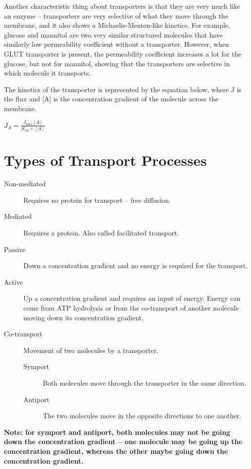 Another characteristic thing about transporters is that they are very much like an enzyme -- transporters are very selective of what they move through the membrane, and it also shows a Michaelis-Menten-like kinetics.
For example, glucose and mannitol are two very similar structured molecules that have similarly low permeability coefficient without a transporter.
However, when GLUT transporter is present, the permeability coefficient increases a lot for the glucose, but not for mannitol, showing that the transporters are selective in which molecule it transports.

\begin{center}
\end{center}

The kinetics of the transporter is represented by the equation below, where J is the flux and [A] is the concentration gradient of the molecule across the membrane.

\begin{center}
\large{$J_A = \frac{J_{max}[A]}{K_M + [A]}$}
\end{center}

\section{Types of Transport Processes}

\begin{description}
\item [Non-mediated] Requires no protein for transport -- free diffusion.
\item [Mediated] Requires a protein. Also called facilitated transport.
\item [Passive] Down a concentration gradient and no energy is required for the transport.
\item [Active] Up a concentration gradient and requires an input of energy. Energy can come from ATP hydrolysis or from the co-transport of another molecule moving down its concentration gradient.
\item [Co-transport] Movement of two molecules by a transporter.
\begin{description}
\item [Symport] Both molecules move through the transporter in the same direction.
\item [Antiport] The two molecules move in the opposite directions to one another.
\end{description}
\end{description}

\vspace{0.5cm}

\noindent
\textbf{Note: for symport and antiport, both molecules may not be going down the concentration gradient -- one molecule may be going up the concentration gradient, whereas the other maybe going down the concentration gradient.}


